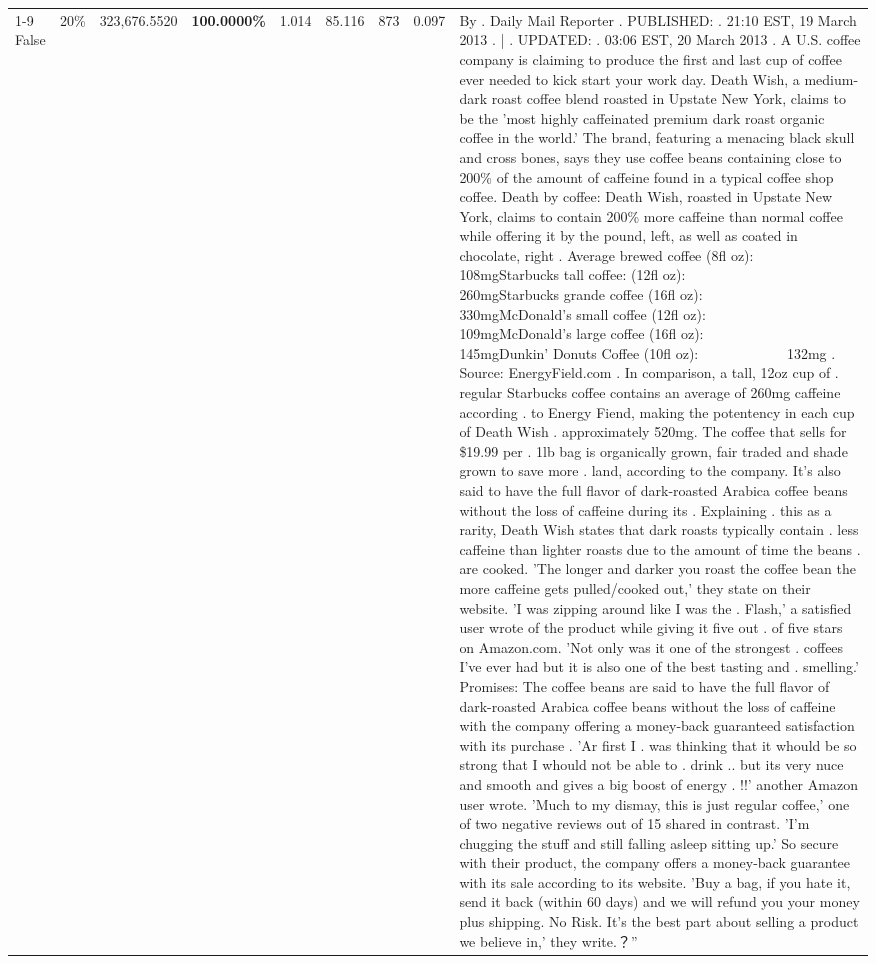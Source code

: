 \begin{table}[H]
{\begin{tabular}{lllrlllll}
\cline{1-9} \cline{2-9}
False & 20\% & 323,676.5520 & \bfseries \color{red} 100.0000\% & 1.014 & 85.116 & 873 & 0.097 & By . Daily Mail Reporter . PUBLISHED: . 21:10 EST, 19 March 2013 . | . UPDATED: . 03:06 EST, 20 March 2013 . A U.S. coffee company is claiming to produce the first and last cup of coffee ever needed to kick start your work day. Death Wish, a medium-dark roast coffee blend roasted in Upstate New York, claims to be the 'most highly caffeinated premium dark roast organic coffee in the world.' The brand, featuring a menacing black skull and cross bones, says they use coffee beans containing close to 200\% of the amount of caffeine found in a typical coffee shop coffee. Death by coffee: Death Wish, roasted in Upstate New York, claims to contain 200\% more caffeine than normal coffee while offering it by the pound, left, as well as coated in chocolate, right . Average brewed coffee (8fl oz):              108mgStarbucks tall coffee: (12fl oz):                260mgStarbucks grande coffee (16fl oz):         330mgMcDonald's small coffee (12fl oz):           109mgMcDonald's large coffee (16fl oz):           145mgDunkin' Donuts Coffee (10fl oz):             132mg . Source: EnergyField.com . In comparison, a tall, 12oz cup of . regular Starbucks coffee contains an average of 260mg caffeine according . to Energy Fiend, making the potentency in each cup of Death Wish . approximately 520mg. The coffee that sells for \$19.99 per . 1lb bag is organically grown, fair traded and shade grown to save more . land, according to the company. It's also said to have the full flavor of dark-roasted Arabica coffee beans without the loss of caffeine during its . Explaining . this as a rarity, Death Wish states that dark roasts typically contain . less caffeine than lighter roasts due to the amount of time the beans . are cooked. 'The longer and darker you roast the coffee bean the more caffeine gets pulled/cooked out,' they state on their website. 'I was zipping around like I was the . Flash,' a satisfied user wrote of the product while giving it five out . of five stars on Amazon.com. 'Not only was it one of the strongest . coffees I've ever had but it is also one of the best tasting and . smelling.’ Promises: The coffee beans are said to have the full flavor of dark-roasted Arabica coffee beans without the loss of caffeine with the company offering a money-back guaranteed satisfaction with its purchase . 'Ar first I . was thinking that it whould be so strong that I whould not be able to . drink .. but its very nuce and smooth and gives a big boost of energy . !!' another Amazon user wrote. 'Much to my dismay, this is just regular coffee,' one of two negative reviews out of 15 shared in contrast. 'I'm chugging the stuff and still falling asleep sitting up.' So secure with their product, the company offers a money-back guarantee with its sale according to its website. 'Buy a bag, if you hate it, send it back (within 60 days) and we will refund you your money plus shipping. No Risk. It’s the best part about selling a product we believe in,' they write.？” \\

\end{tabular}}
\end{table}
